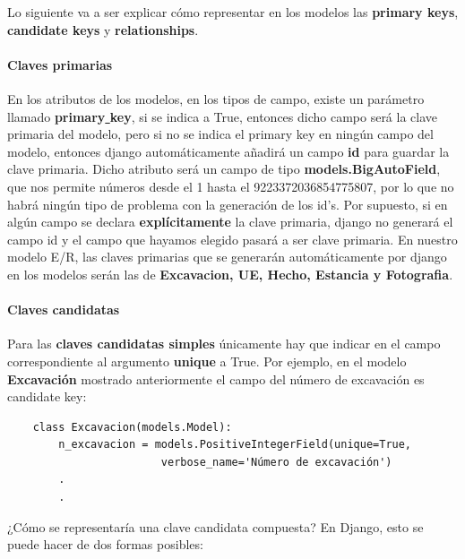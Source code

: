     Lo siguiente va a ser explicar cómo representar en los modelos las \textbf{primary keys},
    \textbf{candidate keys} y \textbf{relationships}.\\
    
    \paragraph{Claves primarias} \underline{}
    \newline En los atributos de los modelos, en los tipos de campo, existe un parámetro llamado
    \textbf{primary\underline{ }key}, si se indica a True, entonces dicho campo será la clave
    primaria del modelo, pero si no se indica el primary key en ningún campo del modelo,
    entonces django automáticamente añadirá un campo \textbf{id} para guardar la clave primaria.
    Dicho atributo será un campo de tipo \textbf{models.BigAutoField}, que nos permite números
    desde el 1 hasta el 9223372036854775807, por lo que no habrá ningún tipo de problema con
    la generación de los id's. Por supuesto, si en algún campo se declara \textbf{explícitamente}
    la clave primaria, django no generará el campo id y el campo que hayamos elegido pasará a
    ser clave primaria. En nuestro modelo E/R, las claves primarias que se generarán
    automáticamente por django en los modelos serán las de \textbf{Excavacion, UE, Hecho,
    Estancia y Fotografia}. 
    
    \paragraph{Claves candidatas} \underline{}
    \newline Para las \textbf{claves candidatas simples} únicamente hay que indicar en el campo
    correspondiente al argumento \textbf{unique} a True. Por ejemplo, en el modelo
    \textbf{Excavación} mostrado anteriormente el campo del número de excavación es
    candidate key:
    
    \begin{verbatim}
    class Excavacion(models.Model):
        n_excavacion = models.PositiveIntegerField(unique=True, 
                        verbose_name='Número de excavación')
        .
        .
    \end{verbatim}

    ¿Cómo se representaría una clave candidata compuesta? En Django, esto se puede hacer de
    dos formas posibles:

